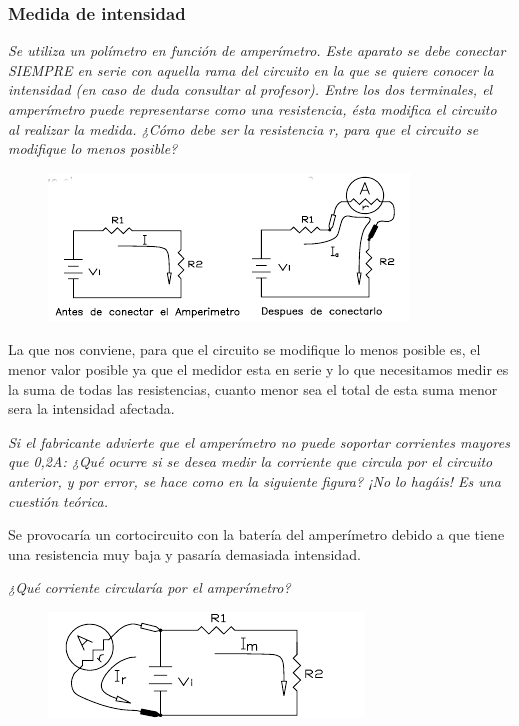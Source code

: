 \documentclass[paper=a4, fontsize=11pt]{scrartcl} %
\numberwithin{equation}{section} %
\numberwithin{figure}{section} %
\numberwithin{table}{section} %
\begin{document}
\subsubsection{Medida de intensidad} 

\textit{Se utiliza un polímetro en función de amperímetro. Este aparato se debe conectar SIEMPRE en serie con aquella rama del circuito en la que se quiere conocer la intensidad (en caso de duda consultar al profesor). Entre los dos terminales, el amperímetro puede representarse como una resistencia, ésta modifica el circuito al realizar la medida.
¿Cómo debe ser la resistencia r, para que el circuito se modifique lo menos posible?}

\begin{figure}[h]
	\centering
	\includegraphics{image/medida-intensidad1}
\end{figure}

La que nos conviene, para que el circuito se modifique lo menos posible es, el menor valor posible ya que el medidor esta en serie y lo que necesitamos medir es la suma de todas las resistencias, cuanto menor sea el total de esta suma menor sera la intensidad afectada. \newline

\textit{Si el fabricante advierte que el amperímetro no puede soportar corrientes mayores que 0,2A: ¿Qué ocurre si se desea medir la corriente que circula por el circuito anterior, y por error, se hace como en la siguiente figura?  ¡No lo hagáis!  Es una cuestión teórica.} \newline

Se provocaría un cortocircuito con la batería del amperímetro debido a que tiene una resistencia muy baja y pasaría demasiada intensidad. \newline

\textit{¿Qué corriente circularía por el amperímetro?}

\begin{figure}[h]
	\centering
	\includegraphics{image/medida-intensidad2}
\end{figure}
\end{document}

